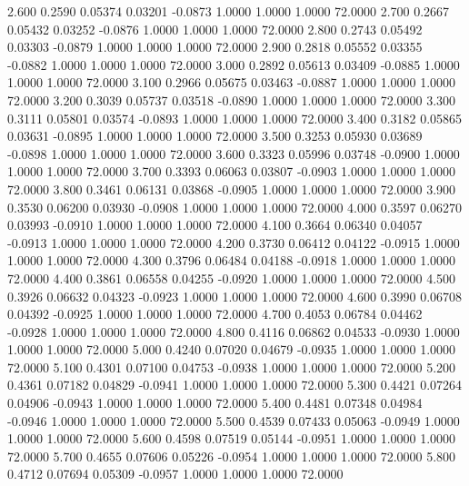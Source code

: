    2.600   0.2590   0.05374   0.03201  -0.0873   1.0000   1.0000   1.0000  72.0000
   2.700   0.2667   0.05432   0.03252  -0.0876   1.0000   1.0000   1.0000  72.0000
   2.800   0.2743   0.05492   0.03303  -0.0879   1.0000   1.0000   1.0000  72.0000
   2.900   0.2818   0.05552   0.03355  -0.0882   1.0000   1.0000   1.0000  72.0000
   3.000   0.2892   0.05613   0.03409  -0.0885   1.0000   1.0000   1.0000  72.0000
   3.100   0.2966   0.05675   0.03463  -0.0887   1.0000   1.0000   1.0000  72.0000
   3.200   0.3039   0.05737   0.03518  -0.0890   1.0000   1.0000   1.0000  72.0000
   3.300   0.3111   0.05801   0.03574  -0.0893   1.0000   1.0000   1.0000  72.0000
   3.400   0.3182   0.05865   0.03631  -0.0895   1.0000   1.0000   1.0000  72.0000
   3.500   0.3253   0.05930   0.03689  -0.0898   1.0000   1.0000   1.0000  72.0000
   3.600   0.3323   0.05996   0.03748  -0.0900   1.0000   1.0000   1.0000  72.0000
   3.700   0.3393   0.06063   0.03807  -0.0903   1.0000   1.0000   1.0000  72.0000
   3.800   0.3461   0.06131   0.03868  -0.0905   1.0000   1.0000   1.0000  72.0000
   3.900   0.3530   0.06200   0.03930  -0.0908   1.0000   1.0000   1.0000  72.0000
   4.000   0.3597   0.06270   0.03993  -0.0910   1.0000   1.0000   1.0000  72.0000
   4.100   0.3664   0.06340   0.04057  -0.0913   1.0000   1.0000   1.0000  72.0000
   4.200   0.3730   0.06412   0.04122  -0.0915   1.0000   1.0000   1.0000  72.0000
   4.300   0.3796   0.06484   0.04188  -0.0918   1.0000   1.0000   1.0000  72.0000
   4.400   0.3861   0.06558   0.04255  -0.0920   1.0000   1.0000   1.0000  72.0000
   4.500   0.3926   0.06632   0.04323  -0.0923   1.0000   1.0000   1.0000  72.0000
   4.600   0.3990   0.06708   0.04392  -0.0925   1.0000   1.0000   1.0000  72.0000
   4.700   0.4053   0.06784   0.04462  -0.0928   1.0000   1.0000   1.0000  72.0000
   4.800   0.4116   0.06862   0.04533  -0.0930   1.0000   1.0000   1.0000  72.0000
   5.000   0.4240   0.07020   0.04679  -0.0935   1.0000   1.0000   1.0000  72.0000
   5.100   0.4301   0.07100   0.04753  -0.0938   1.0000   1.0000   1.0000  72.0000
   5.200   0.4361   0.07182   0.04829  -0.0941   1.0000   1.0000   1.0000  72.0000
   5.300   0.4421   0.07264   0.04906  -0.0943   1.0000   1.0000   1.0000  72.0000
   5.400   0.4481   0.07348   0.04984  -0.0946   1.0000   1.0000   1.0000  72.0000
   5.500   0.4539   0.07433   0.05063  -0.0949   1.0000   1.0000   1.0000  72.0000
   5.600   0.4598   0.07519   0.05144  -0.0951   1.0000   1.0000   1.0000  72.0000
   5.700   0.4655   0.07606   0.05226  -0.0954   1.0000   1.0000   1.0000  72.0000
   5.800   0.4712   0.07694   0.05309  -0.0957   1.0000   1.0000   1.0000  72.0000
